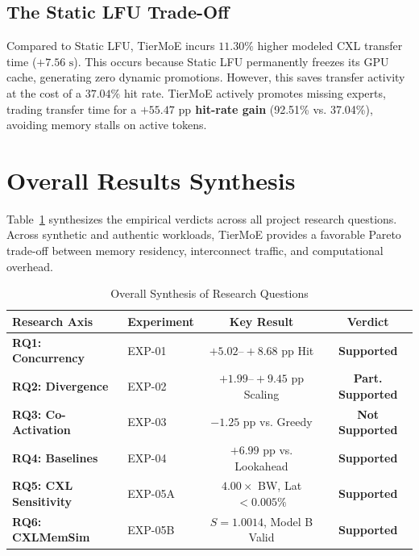 \documentclass[10pt,journal,compsoc]{IEEEtran}
\begin{document}
\subsection{The Static LFU Trade-Off}
Compared to Static LFU, TierMoE incurs $11.30\%$ higher modeled CXL transfer time ($+7.56\text{ s}$). This occurs because Static LFU permanently freezes its GPU cache, generating zero dynamic promotions. However, this saves transfer activity at the cost of a $37.04\%$ hit rate. TierMoE actively promotes missing experts, trading transfer time for a \textbf{$+55.47\text{ pp}$ hit-rate gain} (92.51\% vs. 37.04\%), avoiding memory stalls on active tokens.

\section{Overall Results Synthesis}
\label{sec:synthesis}

Table~\ref{tab:rq_verdicts} synthesizes the empirical verdicts across all project research questions. Across synthetic and authentic workloads, TierMoE provides a favorable Pareto trade-off between memory residency, interconnect traffic, and computational overhead.

\begin{table}[t]
\caption{Overall Synthesis of Research Questions}
\label{tab:rq_verdicts}
\centering
\begin{tabular}{@{}llcc@{}}
\toprule
\textbf{Research Axis} & \textbf{Experiment} & \textbf{Key Result} & \textbf{Verdict} \\
\midrule
\textbf{RQ1: Concurrency} & EXP-01 & $+5.02\text{--}+8.68\text{ pp}$ Hit & \textbf{Supported} \\
\textbf{RQ2: Divergence} & EXP-02 & $+1.99\text{--}+9.45\text{ pp}$ Scaling & \textbf{Part. Supported} \\
\textbf{RQ3: Co-Activation} & EXP-03 & $-1.25\text{ pp}$ vs. Greedy & \textbf{Not Supported} \\
\textbf{RQ4: Baselines} & EXP-04 & $+6.99\text{ pp}$ vs. Lookahead & \textbf{Supported} \\
\textbf{RQ5: CXL Sensitivity} & EXP-05A & $4.00\times$ BW, Lat $< 0.005\%$ & \textbf{Supported} \\
\textbf{RQ6: CXLMemSim} & EXP-05B & $S=1.0014$, Model B Valid & \textbf{Supported} \\
\bottomrule
\end{tabular}
\end{table}
\end{document}
